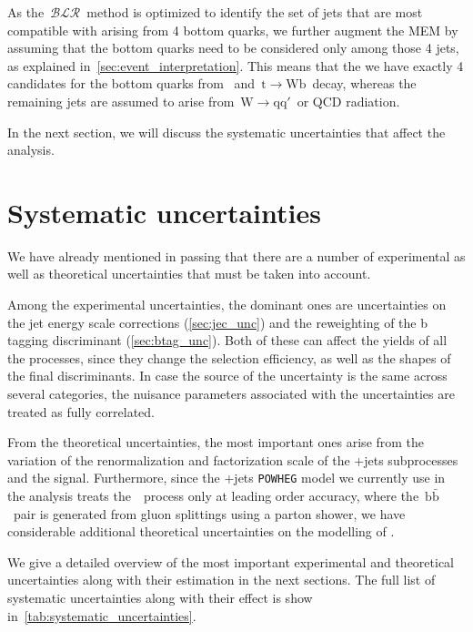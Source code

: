 As the~$\mathcal{BLR}$~method is optimized to identify the set of jets that are most compatible with arising from 4 bottom quarks, we further augment the MEM by assuming that the bottom quarks need to be considered only among those 4 jets, as explained in~\cref{sec:event_interpretation}. This means that the we have exactly 4 candidates for the bottom quarks from \Hbb~and~$\mathrm{t} \rightarrow \mathrm{W} \mathrm{b}$~decay, whereas the remaining jets are assumed to arise from~$\mathrm{W} \rightarrow \mathrm{q} \mathrm{q}'$~or QCD radiation. 

In the next section, we will discuss the systematic uncertainties that affect the analysis.

\section{Systematic uncertainties}
\label{sec:systematic_unc}
We have already mentioned in passing that there are a number of experimental as well as theoretical uncertainties that must be taken into account.

Among the experimental uncertainties, the dominant ones are uncertainties on the jet energy scale corrections (\cref{sec:jec_unc}) and the reweighting of the b tagging discriminant (\cref{sec:btag_unc}). Both of these can affect the yields of all the processes, since they change the selection efficiency, as well as the shapes of the final discriminants. In case the source of the uncertainty is the same across several categories, the nuisance parameters associated with the uncertainties are treated as fully correlated.

From the theoretical uncertainties, the most important ones arise from the variation of the renormalization and factorization scale of the \ttbar+jets subprocesses and the \ttH signal. Furthermore, since the \ttbar+jets \texttt{POWHEG} model we currently use in the analysis treats the~\ttbb~process only at leading order accuracy, where the~$\mathrm{b}\bar{\mathrm{b}}$~pair is generated from gluon splittings using a parton shower, we have considerable additional theoretical uncertainties on the modelling of \ttbb.

We give a detailed overview of the most important experimental and theoretical uncertainties along with their estimation in the next sections. The full list of systematic uncertainties along with their effect is show in~\cref{tab:systematic_uncertainties}.

